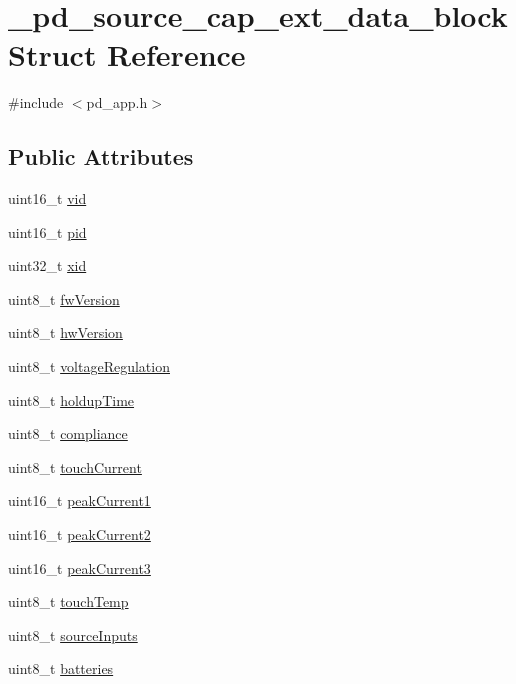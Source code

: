\hypertarget{struct__pd__source__cap__ext__data__block}{\section{\-\_\-pd\-\_\-source\-\_\-cap\-\_\-ext\-\_\-data\-\_\-block Struct Reference}
\label{struct__pd__source__cap__ext__data__block}
}


{\ttfamily \#include $<$pd\-\_\-app.\-h$>$}

\subsection*{Public Attributes}
\begin{DoxyCompactItemize}
\item 
uint16\-\_\-t \hyperlink{struct__pd__source__cap__ext__data__block_a3ebf0b088d638829f685c9e401af51d9}{vid}
\item 
uint16\-\_\-t \hyperlink{struct__pd__source__cap__ext__data__block_ac452b1d60d7700625f5a48e4e688bc74}{pid}
\item 
uint32\-\_\-t \hyperlink{struct__pd__source__cap__ext__data__block_a7422db66b33622addc1c55d9876bd495}{xid}
\item 
uint8\-\_\-t \hyperlink{struct__pd__source__cap__ext__data__block_a5f9b161cdc688ae7a7a71ac48bebe72b}{fw\-Version}
\item 
uint8\-\_\-t \hyperlink{struct__pd__source__cap__ext__data__block_a72634ef8e798fcfdda60b4d1b2ddf557}{hw\-Version}
\item 
uint8\-\_\-t \hyperlink{struct__pd__source__cap__ext__data__block_a46bcde86423f903c6f8a4da9bcf51bb6}{voltage\-Regulation}
\item 
uint8\-\_\-t \hyperlink{struct__pd__source__cap__ext__data__block_acd3a7351454a6578915d6b19d4180d11}{holdup\-Time}
\item 
uint8\-\_\-t \hyperlink{struct__pd__source__cap__ext__data__block_a81f30982a025f2c95364bf63aa9e1f49}{compliance}
\item 
uint8\-\_\-t \hyperlink{struct__pd__source__cap__ext__data__block_af98322f226a696aacedd45960c40849f}{touch\-Current}
\item 
uint16\-\_\-t \hyperlink{struct__pd__source__cap__ext__data__block_a4eee075250035a99554419d33a85921e}{peak\-Current1}
\item 
uint16\-\_\-t \hyperlink{struct__pd__source__cap__ext__data__block_a25ec3362e39d7bc3a9c27fb0f4f2cea1}{peak\-Current2}
\item 
uint16\-\_\-t \hyperlink{struct__pd__source__cap__ext__data__block_a7c1773f9c947bd695a44048f73bc1f43}{peak\-Current3}
\item 
uint8\-\_\-t \hyperlink{struct__pd__source__cap__ext__data__block_a58888000c9e3c7cdbe2dcc4d37f1640e}{touch\-Temp}
\item 
uint8\-\_\-t \hyperlink{struct__pd__source__cap__ext__data__block_a8c7747c758e6d178e63521ce87c7e650}{source\-Inputs}
\item 
uint8\-\_\-t \hyperlink{struct__pd__source__cap__ext__data__block_abdc72f29c41ce7930810313d60222b61}{batteries}
\end{DoxyCompactItemize}


